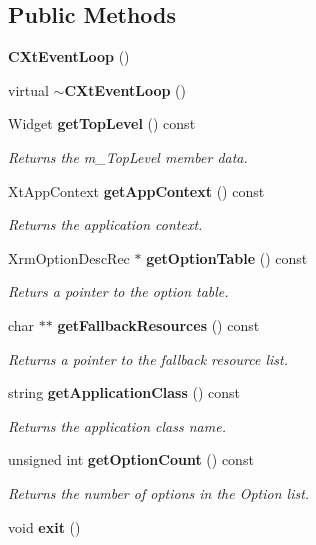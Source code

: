 \subsection*{Public Methods}
\begin{CompactItemize}
\item 
{\bf CXt\-Event\-Loop} ()
\item 
virtual {\bf $\sim$CXt\-Event\-Loop} ()
\item 
Widget {\bf get\-Top\-Level} () const
\begin{CompactList}\small\item\em Returns the m\_\-Top\-Level member data.\item\end{CompactList}\item 
Xt\-App\-Context {\bf get\-App\-Context} () const
\begin{CompactList}\small\item\em Returns the application context.\item\end{CompactList}\item 
Xrm\-Option\-Desc\-Rec $\ast$ {\bf get\-Option\-Table} () const
\begin{CompactList}\small\item\em Returs a pointer to the option table.\item\end{CompactList}\item 
char $\ast$$\ast$ {\bf get\-Fallback\-Resources} () const
\begin{CompactList}\small\item\em Returns a pointer to the fallback resource list.\item\end{CompactList}\item 
string {\bf get\-Application\-Class} () const
\begin{CompactList}\small\item\em Returns the application class name.\item\end{CompactList}\item 
unsigned int {\bf get\-Option\-Count} () const
\begin{CompactList}\small\item\em Returns the number of options in the Option list.\item\end{CompactList}\item 
void {\bf exit} ()
\end{CompactItemize}
